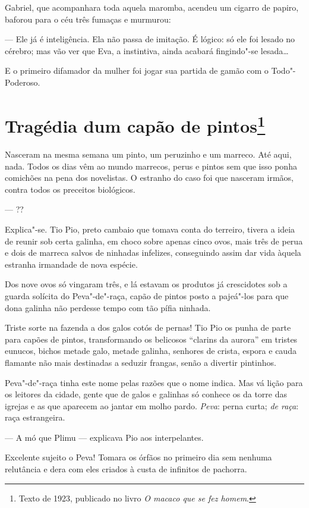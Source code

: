 Gabriel, que acompanhara toda aquela maromba, acendeu um cigarro de
papiro, baforou para o céu três fumaças e murmurou:

--- Ele já é inteligência. Ela não passa de imitação. É lógico: só ele
foi lesado no cérebro; mas vão ver que Eva, a instintiva, ainda acabará
fingindo"-se lesada\ldots{}

E o primeiro difamador da mulher foi jogar sua partida de gamão com o
Todo"-Poderoso.

\chapter{Tragédia dum capão de pintos\footnote[*]{Texto de 1923, publicado no livro \emph{O macaco que se fez homem}.}}

Nasceram na mesma semana um pinto, um peruzinho e um marreco. Até aqui,
nada. Todos os dias vêm ao mundo marrecos, perus e pintos sem que isso
ponha comichões na pena dos novelistas. O estranho do caso foi que
nasceram irmãos, contra todos os preceitos biológicos.

--- ??

Explica"-se. Tio Pio, preto cambaio que tomava conta do terreiro, tivera
a ideia de reunir sob certa galinha, em choco sobre apenas cinco ovos,
mais três de perua e dois de marreca salvos de ninhadas infelizes,
conseguindo assim dar vida àquela estranha irmandade de nova espécie.

Dos nove ovos só vingaram três, e lá estavam os produtos já crescidotes
sob a guarda solícita do Peva"-de"-raça, capão de pintos posto a pajeá"-los
para que dona galinha não perdesse tempo com tão pífia ninhada.

Triste sorte na fazenda a dos galos cotós de pernas! Tio Pio os punha de
parte para capões de pintos, transformando os belicosos ``clarins da
aurora'' em tristes eunucos, bichos metade galo, metade galinha,
senhores de crista, espora e cauda flamante não mais destinadas a
seduzir frangas, senão a divertir pintinhos.

Peva"-de"-raça tinha este nome pelas razões que o nome indica. Mas vá
lição para os leitores da cidade, gente que de galos e galinhas só
conhece os da torre das igrejas e as que aparecem ao jantar em molho
pardo. \emph{Peva}: perna curta; \emph{de raça}: raça estrangeira.

--- A mó que Plimu --- explicava Pio aos interpelantes.

Excelente sujeito o Peva! Tomara os órfãos no primeiro dia sem nenhuma
relutância e dera com eles criados à custa de infinitos de pachorra.

